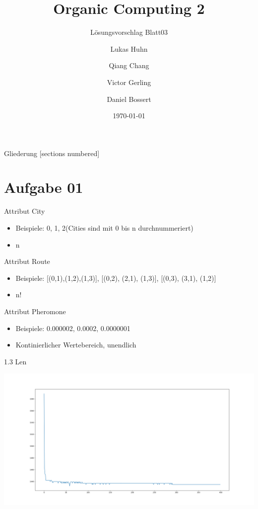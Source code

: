 \documentclass{ocbeameruni}
\title{Organic Computing 2}
\subtitle{Lösungsvorschlag Blatt03}
\date{\today}
\author{Lukas Huhn \and Qiang Chang \and Victor Gerling \and Daniel Bossert}
\institute{%
  Universität Augsburg\\
  Institut für Informatik\\
  Lehrstuhl für Organic Computing
}
\begin{document}
\maketitle


\begin{frame}{Gliederung}
  [sections numbered]
  \tableofcontents
\end{frame}


\section{Aufgabe 01}

\begin{frame}{Attribut City}
    \begin{itemize}
    \item Beispiele: 0, 1, 2(Cities sind mit 0 bis n durchnummeriert)
    \item n
    \end{itemize}
\end{frame}

\begin{frame}{Attribut Route}
    \begin{itemize}
    \item Beispiele: [(0,1),(1,2),(1,3)], [(0,2), (2,1), (1,3)], [(0,3), (3,1), (1,2)]
    \item n!
    \end{itemize}
\end{frame}

\begin{frame}{Attribut Pheromone}
    \begin{itemize}
    \item Beispiele: 0.000002, 0.0002, 0.0000001
    \item Kontinierlicher Wertebereich, unendlich
    \end{itemize}
\end{frame}

\begin{frame}{1.3 Len}
    \begin{center}
    \includegraphics[scale=0.2]{Avg_len_per_iter.png}
    \end{center}
\end{frame}
\end{document}
